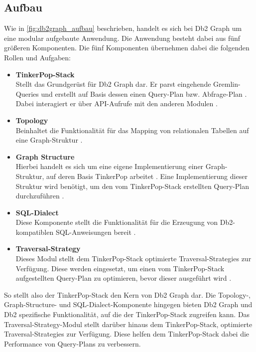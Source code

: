 \subsection{Aufbau}
Wie in \autoref{fig:db2graph_aufbau} beschrieben, handelt es sich bei Db2 Graph um eine modular aufgebaute Anwendung. Die Anwendung besteht dabei aus fünf größeren Komponenten. Die fünf Komponenten übernehmen dabei die folgenden Rollen und Aufgaben: 

\begin{itemize}
    \item \textbf{TinkerPop-Stack}\\Stellt das Grundgerüst für Db2 Graph dar. Er parst eingehende Gremlin-Queries und erstellt auf Basis dessen einen Query-Plan bzw. Abfrage-Plan \cite{vldb_tian}. Dabei interagiert er über API-Aufrufe mit den anderen Modulen \cite{vldb_tian}.
    \item \textbf{Topology}\\Beinhaltet die Funktionalität für das Mapping von relationalen Tabellen auf eine Graph-Struktur \cite{vldb_tian, sigmod_tian}.
    \item \textbf{Graph Structure}\\Hierbei handelt es sich um eine eigene Implementierung einer Graph-Struktur, auf deren Basis TinkerPop arbeitet \cite{vldb_tian}. Eine Implementierung dieser Struktur wird benötigt, um den vom TinkerPop-Stack erstellten Query-Plan durchzuführen \cite{sigmod_tian}. 
    \item \textbf{SQL-Dialect}\\Diese Komponente stellt die Funktionalität für die Erzeugung von Db2-kompatiblen SQL-Anweisungen bereit \cite{sigmod_tian}.
    \item \textbf{Traversal-Strategy}\\Dieses Modul stellt dem TinkerPop-Stack optimierte Traversal-Strategies zur Verfügung. Diese werden eingesetzt, um einen vom TinkerPop-Stack aufgestellten Query-Plan zu optimieren, bevor dieser ausgeführt wird \cite{sigmod_tian}.  
\end{itemize}

So stellt also der TinkerPop-Stack den Kern von Db2 Graph dar. Die Topology-, Graph-Structure- und SQL-Dialect-Komponente hingegen bieten Db2 Graph und Db2 spezifische Funktionalität, auf die der TinkerPop-Stack zugreifen kann. Das Traversal-Strategy-Modul stellt darüber hinaus dem TinkerPop-Stack, optimierte Traversal-Strategies zur Verfügung. Diese helfen dem TinkerPop-Stack dabei die Performance von Query-Plans zu verbessern.  

